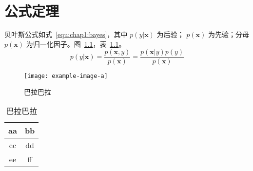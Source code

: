 
\chapter{公式定理}
\label{sec:equation}
贝叶斯公式如式~\eqref{equ:chap1:bayes}，其中 $p(y|\boldsymbol{x})$ 为后验；
$p(\boldsymbol{x})$ 为先验；分母 $p(\boldsymbol{x})$ 为归一化因子\cite{刘建军2013GAP}。图~\ref{fig:1}，表~\ref{tab:1}。
\begin{equation}
\label{equ:chap1:bayes}
p(y|\boldsymbol{x}) = \frac{p(\boldsymbol{x},y)}{p(\boldsymbol{x})}=
\frac{p(\boldsymbol{x}|y)p(y)}{p(\boldsymbol{x})} 
\end{equation}

\begin{figure}[!htb]
\centering
\texttt{[image: example-image-a]}
\caption{巴拉巴拉}
\label{fig:1}
\end{figure}

\begin{table}[!ht]
\centering
\caption{巴拉巴拉}
\label{tab:1}
\begin{tabular}{cc}
\toprule
aa & bb \\
\midrule
cc & dd \\
ee & ff \\
\bottomrule
\end{tabular}
\end{table}